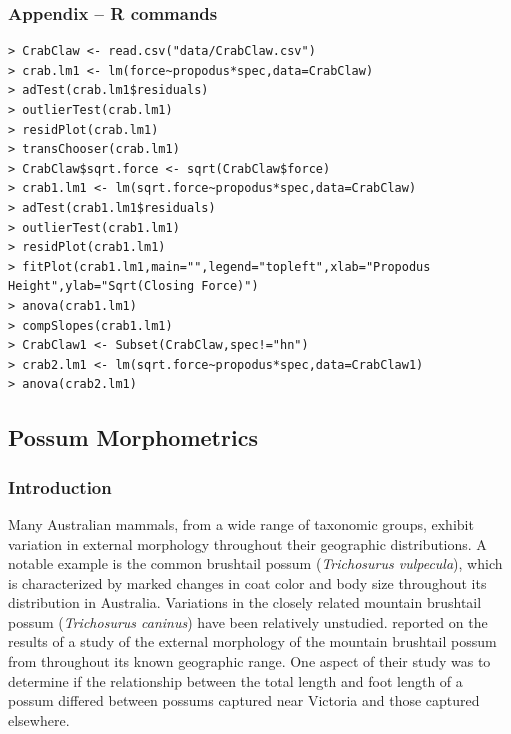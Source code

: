 \documentclass[10pt,openany]{book}\usepackage[]{graphicx}\usepackage[]{color}
\begin{document}
\subsubsection*{Appendix -- R commands}
\begin{Verbatim}[formatcom=\color{red},xleftmargin=5mm,commandchars=\\\{\}]
> CrabClaw <- read.csv("data/CrabClaw.csv")
> crab.lm1 <- lm(force~propodus*spec,data=CrabClaw)
> adTest(crab.lm1$residuals)
> outlierTest(crab.lm1)
> residPlot(crab.lm1)
> transChooser(crab.lm1)
> CrabClaw$sqrt.force <- sqrt(CrabClaw$force)
> crab1.lm1 <- lm(sqrt.force~propodus*spec,data=CrabClaw)
> adTest(crab1.lm1$residuals)
> outlierTest(crab1.lm1)
> residPlot(crab1.lm1)
> fitPlot(crab1.lm1,main="",legend="topleft",xlab="Propodus Height",ylab="Sqrt(Closing Force)")
> anova(crab1.lm1)
> compSlopes(crab1.lm1)
> CrabClaw1 <- Subset(CrabClaw,spec!="hn")
> crab2.lm1 <- lm(sqrt.force~propodus*spec,data=CrabClaw1)
> anova(crab2.lm1)
\end{Verbatim}


\subsection{Possum Morphometrics}
\subsubsection*{Introduction}
Many Australian mammals, from a wide range of taxonomic groups, exhibit variation in external morphology throughout their geographic distributions.  A notable example is the common brushtail possum (\emph{Trichosurus vulpecula}), which is characterized by marked changes in coat color and body size throughout its distribution in Australia.  Variations in the closely related mountain brushtail possum (\emph{Trichosurus caninus}) have been relatively unstudied.  \cite{Lindenmayeretal1995} reported on the results of a study of the external morphology of the mountain brushtail possum from throughout its known geographic range.  One aspect of their study was to determine if the relationship between the total length and foot length of a possum differed between possums captured near Victoria and those captured elsewhere.
\end{document}
